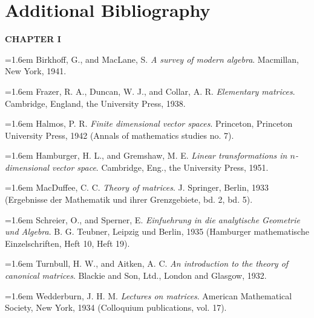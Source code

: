 \begingroup
\let\cleardoublepage\clearpage
\chapter*{Additional Bibliography}
\endgroup
{}

\newcommand{\abib}[1]{\par\noindent\hangindent=1.6em\hangafter=1 #1\par}
\newcommand{\abibhead}[1]{\vspace{0.9em}\begin{center}\large\bfseries #1\end{center}\vspace{0.2em}}

\abibhead{CHAPTER I}
\abib{Birkhoff, G., and MacLane, S. \emph{A survey of modern algebra}. Macmillan, New York, 1941.}
\abib{Frazer, R. A., Duncan, W. J., and Collar, A. R. \emph{Elementary matrices}. Cambridge, England, the University Press, 1938.}
\abib{Halmos, P. R. \emph{Finite dimensional vector spaces}. Princeton, Princeton University Press, 1942 (Annals of mathematics studies no. 7).}
\abib{Hamburger, H. L., and Gremshaw, M. E. \emph{Linear transformations in $n$-dimensional vector space}. Cambridge, Eng., the University Press, 1951.}
\abib{MacDuffee, C. C. \emph{Theory of matrices}. J. Springer, Berlin, 1933 (Ergebnisse der Mathematik und ihrer Grenzgebiete, bd. 2, bd. 5).}
\abib{Schreier, O., and Sperner, E. \emph{Einfuehrung in die analytische Geometrie und Algebra}. B. G. Teubner, Leipzig und Berlin, 1935 (Hamburger mathematische Einzelschriften, Heft 10, Heft 19).}
\abib{Turnbull, H. W., and Aitken, A. C. \emph{An introduction to the theory of canonical matrices}. Blackie and Son, Ltd., London and Glasgow, 1932.}
\abib{Wedderburn, J. H. M. \emph{Lectures on matrices}. American Mathematical Society, New York, 1934 (Colloquium publications, vol. 17).}

